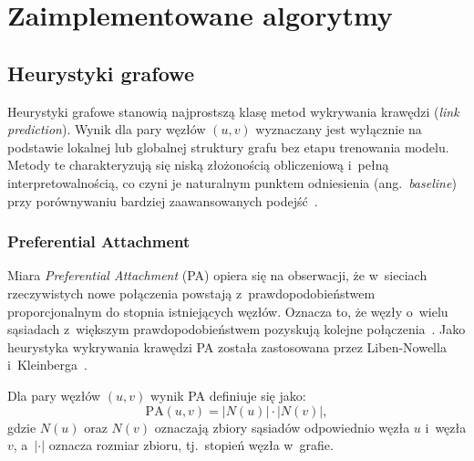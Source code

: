 \documentclass[polish,master,a4paper,oneside]{ppfcmthesis}
\begin{document}

\section{Zaimplementowane algorytmy}
\label{sec:algorytmy}


\subsection{Heurystyki grafowe}

Heurystyki grafowe stanowią najprostszą klasę metod wykrywania krawędzi
(\textit{link prediction}). Wynik dla pary węzłów $(u, v)$ wyznaczany jest
wyłącznie na podstawie lokalnej lub globalnej struktury grafu bez etapu
trenowania modelu. Metody te charakteryzują się niską złożonością obliczeniową
i~pełną interpretowalnością, co czyni je naturalnym punktem odniesienia
(ang.\ \textit{baseline}) przy porównywaniu bardziej zaawansowanych
podejść~\cite{LibenNowell2007}.

\subsubsection{Preferential Attachment}

Miara \textit{Preferential Attachment} (PA) opiera się na obserwacji, że
w~sieciach rzeczywistych nowe połączenia powstają z~prawdopodobieństwem
proporcjonalnym do stopnia istniejących węzłów. Oznacza to, że węzły o~wielu sąsiadach
z~większym prawdopodobieństwem pozyskują kolejne
połączenia~\cite{Barabasi1999}. 
Jako heurystyka wykrywania krawędzi PA została zastosowana przez Liben-Nowella i~Kleinberga~\cite{LibenNowell2007}.

Dla pary węzłów $(u, v)$ wynik PA definiuje się jako:
%
\[
  \mathrm{PA}(u, v) = |N(u)| \cdot |N(v)|,
\]
%
gdzie $N(u)$ oraz $N(v)$ oznaczają zbiory sąsiadów odpowiednio węzła $u$
i~węzła $v$, a~$|\cdot|$ oznacza rozmiar zbioru, tj.\ stopień węzła w~grafie.
\end{document}
